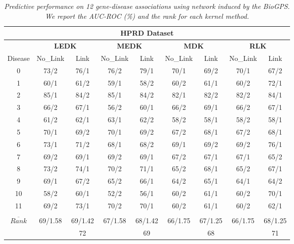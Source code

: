 \documentclass{article}
\begin{document}
\begin{table*}[b]
\centering
\begin{tabular}{|c|c|c|c|c|c|c|c|c|}
\hline
         \multicolumn{9}{|c|}{\textbf{HPRD Dataset}}\\
 \hline
 & \multicolumn{2}{c|}{\textbf{LEDK}} & \multicolumn{2}{c|}{\textbf{MEDK}} & \multicolumn{2}{c|}{\textbf{MDK}} & \multicolumn{2}{c|}{\textbf{RLK}} \\
 \hline
  Disease & No\_Link & Link & No\_Link & Link & No\_Link & Link & No\_Link & Link \\
 \hline
	0 & 73/2 & 76/1 & 76/2 & 79/1 & 70/1 & 69/2 & 70/1 & 67/2 \\

	1 & 60/1 & 61/2 & 59/1 & 58/2 & 60/2 & 61/1 & 60/2 & 72/1 \\

	2 & 85/1 & 84/2 & 85/1 & 84/2 & 82/1 & 82/2 & 82/2 & 84/1 \\

	3 & 66/2 & 67/1 & 56/2 & 60/1 & 66/2 & 69/1 & 66/2 & 67/1 \\

	4 & 61/2 & 62/1 & 63/1 & 62/2 & 58/2 & 58/1 & 58/2 & 58/1 \\

	5 & 70/1 & 69/2 & 70/1 & 69/2 & 67/2 & 68/1 & 67/2 & 68/1 \\

	6 & 73/1 & 71/2 & 68/1 & 68/2 & 69/1 & 69/2 & 69/2 & 76/1 \\

	7 & 69/2 & 69/1 & 69/2 & 69/1 & 67/2 & 67/1 & 67/1 & 65/2 \\

	8 & 73/2 & 74/1 & 70/2 & 71/1 & 65/2 & 68/1 & 65/2 & 67/1 \\

	9 & 69/1 & 67/2 & 65/2 & 66/1 & 64/2 & 65/1 & 64/1 & 64/2 \\

	10 & 58/2 & 60/1 & 52/2 & 56/1 & 60/2 & 61/1 & 60/2 & 70/1 \\

	11 & 69/2 & 73/1 & 70/2 & 70/1 & 60/2 & 61/1 & 60/2 & 62/1 \\
	
	\hline
	\shortstack{$\overline{AUC}$ \\$\overline{Rank}$} & 69/1.58 & 69/1.42 & 67/1.58 & 68/1.42 & 66/1.75 & 67/1.25 & 66/1.75 & 68/1.25 \\
\hline
    & & 72 & & 69 & & 68 & & 71 \\      						
\hline
\end{tabular}
\caption{\textit {Predictive performance on 12 gene-disease associations using network induced by the BioGPS. We report the AUC-ROC (\%) and the rank for each kernel method.}}
\label{table:results}
\end{table*}
\end{document}
